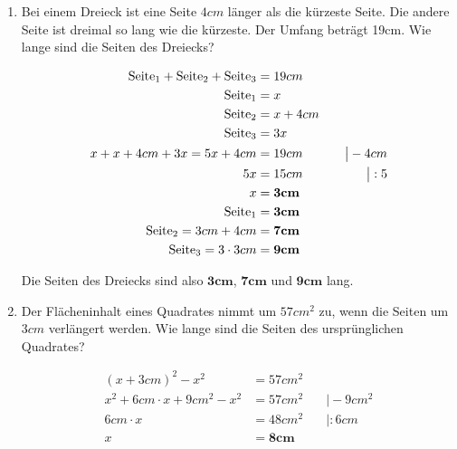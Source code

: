 \documentclass[a4paper,10pt]{article} %
\begin{document}
\begin{enumerate}
    \[
      \begin{aligned}
        2 \cdot (\textnormal{Länge} + Breite) &= 102 &\quad\big| : 2 \\
        \textnormal{Länge} + Breite &= 51 \\
        \textnormal{Länge} = Breite + 9 \\
        Breite + 9 + Breite &= 51 &\quad\big| - 9 \\
        2 \cdot Breite &= 42 &\quad\big| : 2 \\
        Breite &= \mathbf{21}
      \end{aligned}
    \]

    Das Grundstück ist also \(\mathbf{21m}\) breit.

  \item Bei einem Dreieck ist eine Seite \(4cm\) länger als die kürzeste Seite.
    Die andere Seite ist dreimal so lang wie die kürzeste. Der Umfang beträgt 19cm.
    Wie lange sind die Seiten des Dreiecks?

    \[
      \begin{aligned}
        \textnormal{Seite}_1 + \textnormal{Seite}_2 + \textnormal{Seite}_3 &= 19cm \\
        \textnormal{Seite}_1 &= x \\
        \textnormal{Seite}_2 &= x + 4cm \\
        \textnormal{Seite}_3 &= 3x \\
        x + x + 4cm + 3x = 5x + 4cm &= 19cm &\quad\big| - 4cm \\
        5x &= 15cm &\quad\big| : 5 \\
        x &= \mathbf{3cm} \\
        \textnormal{Seite}_1 &= \mathbf{3cm} \\
        \textnormal{Seite}_2 = 3cm + 4cm &= \mathbf{7cm} \\
        \textnormal{Seite}_3 = 3 \cdot 3cm &= \mathbf{9cm}
      \end{aligned}
    \]

    Die Seiten des Dreiecks sind also \(\mathbf{3cm}\), \(\mathbf{7cm}\) und \(\mathbf{9cm}\) lang.

  \item Der Flächeninhalt eines Quadrates nimmt um \(57cm^2\) zu,
    wenn die Seiten um \(3cm\) verlängert werden.
    Wie lange sind die Seiten des ursprünglichen Quadrates?

    \[
      \begin{aligned}
        (x + 3cm)^2 - x^2 &= 57cm^2 \\
        x^2 + 6cm \cdot x + 9cm^2 - x^2 &= 57cm^2 &\quad\big| - 9cm^2 \\
        6cm \cdot x &= 48cm^2 &\quad\big| : 6cm \\
        x &= \mathbf{8cm}
      \end{aligned}
    \]


\end{enumerate}
\end{document}

